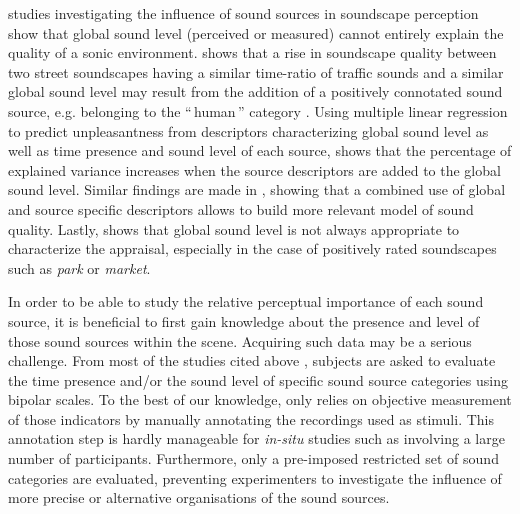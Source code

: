 \documentclass[twoside,twocolumn]{article}
\begin{document}
 studies investigating the influence of sound sources in soundscape perception show that global sound level (perceived or measured) cannot entirely explain the quality of a sonic environment.  \cite{guyot2005urban} shows that a rise in soundscape quality between two street soundscapes having a similar time-ratio of traffic sounds and a similar global sound level may result from the addition of a positively connotated sound source, e.g. belonging to the ``\,human\,'' category  . Using multiple linear regression to predict unpleasantness from descriptors characterizing global sound level as well as time presence and sound level of each source, \cite{lavandier2006contribution} shows that the percentage of explained variance increases when the source descriptors are added to the global sound level. Similar findings are made in \cite{ricciardi2015sound}, showing that a combined use of global and source specific descriptors allows to build more relevant model of sound quality. Lastly, \cite{lavandier2006contribution} shows that global sound level is not always appropriate to characterize the appraisal, especially in the case of positively rated soundscapes such as \textit{park} or \textit{market}. 

In order to be able to study the relative perceptual importance of each sound source, it is beneficial to first gain knowledge about the presence and level of those sound sources within  the scene. Acquiring such data may be a serious challenge. From most of the studies cited above \cite{guyot2005urban, lavandier2006contribution, ricciardi2015sound}, subjects are asked to evaluate the time presence and/or the sound level of specific sound source categories using bipolar scales. To the best of our knowledge, only \cite{lavandier2006contribution} relies on objective measurement of those indicators by manually annotating the recordings used as stimuli. This annotation step is hardly manageable for \emph{in-situ} studies such as \cite{ricciardi2015sound} involving a large number of participants. Furthermore, only a pre-imposed restricted set of sound categories are evaluated, preventing experimenters to investigate the influence of more precise or alternative organisations of the sound sources.
\end{document}
